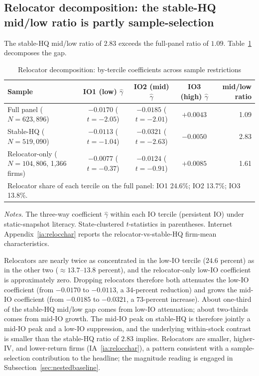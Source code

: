 \subsection{Relocator decomposition: the stable-HQ mid/low ratio is partly sample-selection}
\label{sec:relocator}

The stable-HQ mid/low ratio of $2.83$ exceeds the full-panel ratio of $1.09$. Table~\ref{tab:relocator} decomposes the gap.

\begin{table}[t]
\centering
\caption{Relocator decomposition: by-tercile coefficients across sample restrictions}
\label{tab:relocator}
\footnotesize
\begin{minipage}{\textwidth}
\centering
\begin{tabular}{lcccr}
\toprule
Sample & IO1 (low) $\hat\gamma$ & IO2 (mid) $\hat\gamma$ & IO3 (high) $\hat\gamma$ & mid/low ratio \\
\midrule
Full panel ($N = 623{,}896$)               & $-0.0170$ ($t=-2.05$) & $-0.0185$ ($t=-2.01$) & $+0.0043$ & 1.09 \\
Stable-HQ ($N = 519{,}090$)                 & $-0.0113$ ($t=-1.04$) & $-0.0321$ ($t=-2.63$) & $-0.0050$ & 2.83 \\
Relocator-only ($N = 104{,}806$, 1{,}366 firms) & $-0.0077$ ($t=-0.37$) & $-0.0124$ ($t=-0.91$) & $+0.0085$ & 1.61 \\
\midrule
\multicolumn{5}{l}{Relocator share of each tercile on the full panel: IO1 24.6\%; IO2 13.7\%; IO3 13.8\%.} \\
\bottomrule
\end{tabular}
\end{minipage}

\medskip
{\footnotesize\textit{Notes.} The three-way coefficient $\hat\gamma$ within each IO tercile (persistent IO) under static-snapshot literacy. State-clustered $t$-statistics in parentheses. Internet Appendix~\ref{ia:relocchar} reports the relocator-vs-stable-HQ firm-mean characteristics.}
\end{table}

Relocators are nearly twice as concentrated in the low-IO tercile ($24.6$ percent) as in the other two ($\approx 13.7$--$13.8$ percent), and the relocator-only low-IO coefficient is approximately zero. Dropping relocators therefore both attenuates the low-IO coefficient (from $-0.0170$ to $-0.0113$, a $34$-percent reduction) and grows the mid-IO coefficient (from $-0.0185$ to $-0.0321$, a $73$-percent increase). About one-third of the stable-HQ mid/low gap comes from low-IO attenuation; about two-thirds comes from mid-IO growth. The mid-IO peak on stable-HQ is therefore jointly a mid-IO peak and a low-IO suppression, and the underlying within-stock contrast is smaller than the stable-HQ ratio of $2.83$ implies. Relocators are smaller, higher-IV, and lower-return firms (IA~\ref{ia:relocchar}), a pattern consistent with a sample-selection contribution to the headline; the magnitude reading is engaged in Subsection~\ref{sec:nestedbaseline}.

